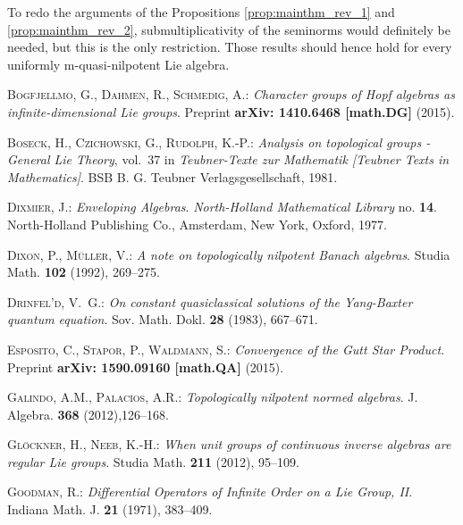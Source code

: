 \documentclass[
11pt,                          %
english                        %
]{article}
\begin{document}
To redo the arguments of the Propositions \ref{prop:mainthm_rev_1} and 
\ref{prop:mainthm_rev_2}, submultiplicativity of the seminorms would definitely be 
needed, but this is the only restriction. Those results should hence hold for every 
uniformly m-quasi-nilpotent Lie algebra.



\begin{thebibliography}{1}

\textsc{Bogfjellmo, G., Dahmen, R., Schmedig, A.: }\newblock \emph{Character
  groups of Hopf algebras as infinite-dimensional Lie groups}.
\newblock Preprint  \textbf{arXiv: 1410.6468 [math.DG]} (2015).

\textsc{Boseck, H., Czichowski, G., Rudolph, K.-P.: }\newblock \emph{Analysis
  on topological groups - General Lie Theory}, vol.~37 in \emph{Teubner-Texte
  zur Mathematik [Teubner Texts in Mathematics]}.
\newblock BSB B. G. Teubner Verlagsgesellschaft, 1981.

\textsc{Dixmier, J.: }\newblock \emph{Enveloping Algebras}.
\newblock \emph{North-Holland Mathematical Library} no. \textbf{14}.
\newblock North-Holland Publishing Co., Amsterdam, New York, Oxford, 1977.

\textsc{Dixon, P., M\"uller, V.: }\newblock \emph{A note on topologically 
nilpotent Banach algebras}.
\newblock Studia Math. \textbf{102} (1992), 269--275.

\textsc{Drinfel'd, V.~G.: }\newblock \emph{On constant quasiclassical solutions
  of the Yang-Baxter quantum equation}.
\newblock Sov. Math. Dokl.  \textbf{28} (1983), 667--671.

\textsc{Esposito, C., Stapor, P., Waldmann, S.: }\newblock \emph{Convergence 
  of the Gutt Star Product}.
\newblock Preprint  \textbf{arXiv: 1590.09160 [math.QA]} (2015).

\textsc{Galindo, A.M., Palacios, A.R.: }\newblock \emph{Topologically nilpotent 
normed algebras}.
\newblock J. Algebra.  \textbf{368} (2012),126--168.

\textsc{Gl{\"o}ckner, H., Neeb, K.-H.: }\newblock \emph{When unit groups of
  continuous inverse algebras are regular Lie groups}.
\newblock Studia Math.  \textbf{211} (2012), 95--109.

\textsc{Goodman, R.: }\newblock \emph{Differential Operators of Infinite Order
  on a Lie Group, II}.
\newblock Indiana Math. J.  \textbf{21} (1971), 383--409.


\end{thebibliography}
\end{document}
